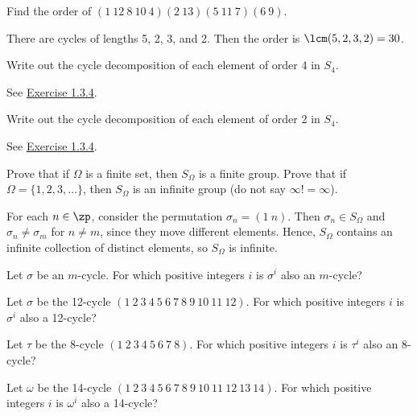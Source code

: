 \begin{exercise}\label{ex1.3.5}
    Find the order of $(1\ 12\ 8\ 10\ 4)(2\ 13)(5\ 11\ 7)(6\ 9)$.
\end{exercise}

\begin{sol}
    There are cycles of lengths 5, 2, 3, and 2. Then the order is $\lcm(5, 2, 3, 2) = 30$.
\end{sol}

\begin{exercise}\label{ex1.3.6}
    Write out the cycle decomposition of each element of order 4 in $S_4$.
\end{exercise}

\begin{sol}
    See \hyperref[ex1.3.4]{Exercise 1.3.4}.
\end{sol}

\begin{exercise}\label{ex1.3.7}
    Write out the cycle decomposition of each element of order 2 in $S_4$.
\end{exercise}

\begin{sol}
    See \hyperref[ex1.3.4]{Exercise 1.3.4}.
\end{sol}

\begin{exercise}\label{ex1.3.8}
     Prove that if $\Omega$ is a finite set, then $S_\Omega$ is a finite group.
    Prove that if $\Omega = \{1,2,3,\dots\}$, then $S_\Omega$ is an infinite group (do not say $\infty! = \infty$).
\end{exercise}

\begin{sol}
    For each $n \in \zp$, consider the permutation $\sigma_n = (1\ n)$. Then $\sigma_n \in S_\Omega$ and $\sigma_n \neq \sigma_m$ for $n \neq m$, since they move different elements. Hence, $S_{\Omega}$ contains an infinite collection of distinct elements, so $S_\Omega$ is infinite.
\end{sol}

\begin{exercise}\label{ex1.3.9}
     Let $\sigma$ be an $m$-cycle. For which positive integers $i$ is $\sigma^i$ also an $m$-cycle?
    \begin{subproblems}
        \item Let $\sigma$ be the 12-cycle $(1\ 2\ 3\ 4\ 5\ 6\ 7\ 8\ 9\ 10\ 11\ 12)$. For which positive integers $i$ is $\sigma^i$ also a 12-cycle?
        \item Let $\tau$ be the 8-cycle $(1\ 2\ 3\ 4\ 5\ 6\ 7\ 8)$. For which positive integers $i$ is $\tau^i$ also an 8-cycle?
        \item Let $\omega$ be the 14-cycle $(1\ 2\ 3\ 4\ 5\ 6\ 7\ 8\ 9\ 10\ 11\ 12\ 13\ 14)$. For which positive integers $i$ is $\omega^i$ also a 14-cycle?
    \end{subproblems}
\end{exercise}

